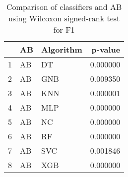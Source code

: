 \begin{table}
\footnotesize
\caption{Comparison of classifiers and AB using Wilcoxon signed-rank test for F1}
\label{tab:AB wilcoxon F1 comparison}
\begin{tabular}{lllr}
\hline
 & AB & Algorithm & p-value \\
\hline
1 & AB & DT & 0.000000 \\
2 & AB & GNB & 0.009350 \\
3 & AB & KNN & 0.000001 \\
4 & AB & MLP & 0.000000 \\
5 & AB & NC & 0.000000 \\
6 & AB & RF & 0.000000 \\
7 & AB & SVC & 0.001846 \\
8 & AB & XGB & 0.000000 \\
\hline
\end{tabular}
\end{table}
